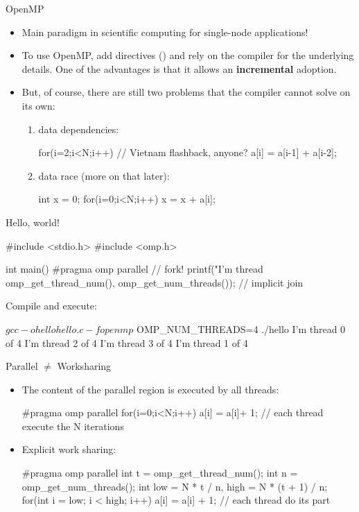 \begin{frame}[fragile]{OpenMP}
	\begin{itemize}
		\item Main paradigm in scientific computing for single-node applications!
		\item To use OpenMP, add directives () and rely on the compiler for the underlying details. One of the advantages is that it allows an \textbf{incremental} adoption.
		\item But, of course, there are still two problems that the compiler cannot solve on its own: \begin{enumerate}
			\item data dependencies:\begin{ccode}
for(i=2;i<N;i++) // Vietnam flashback, anyone?
	a[i] = a[i-1] + a[i-2];
			\end{ccode}
			\item data race (more on that later):\begin{ccode}
int x = 0;
for(i=0;i<N;i++)
	x = x + a[i];
			\end{ccode}
		\end{enumerate}
	\end{itemize}
\end{frame}

\begin{frame}[fragile]{Hello, world!}
	\begin{ccode}
#include <stdio.h>
#include <omp.h>

int main() {
	#pragma omp parallel
	{ // fork!
		printf("I'm thread %
			omp_get_thread_num(), omp_get_num_threads());
	} // implicit join
}
	\end{ccode}
	Compile and execute:
	\begin{textcode}
$ gcc -o hello hello.c -fopenmp
$ OMP_NUM_THREADS=4 ./hello
I'm thread 0 of 4
I'm thread 2 of 4
I'm thread 3 of 4
I'm thread 1 of 4
	\end{textcode}
\end{frame}

\begin{frame}[fragile]{Parallel $\neq$ Worksharing }
	\begin{itemize}
		\item The content of the parallel region is executed by all threads:\begin{ccode}
#pragma omp parallel
{
	for(i=0;i<N;i++)
		a[i] = a[i]+ 1;
} // each thread execute the N iterations
		\end{ccode}
		\item Explicit work sharing:\begin{ccode}
#pragma omp parallel
{
	int t = omp_get_thread_num();
	int n = omp_get_num_threads();
	int low = N * t / n, high = N * (t + 1) / n;
	for(int i = low; i < high; i++)
		a[i] = a[i] + 1;
} // each thread do its part
		\end{ccode}
	\end{itemize}
\end{frame}

